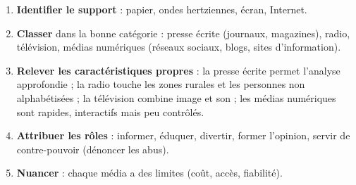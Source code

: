 \documentclass[11pt]{article}
\begin{document}
\begin{methode}
\begin{enumerate}
\item \textbf{Identifier le support} : papier, ondes hertziennes, écran, Internet.
\item \textbf{Classer} dans la bonne catégorie : presse écrite (journaux, magazines), radio, télévision, médias numériques (réseaux sociaux, blogs, sites d'information).
\item \textbf{Relever les caractéristiques propres} : la presse écrite permet l'analyse approfondie ; la radio touche les zones rurales et les personnes non alphabétisées ; la télévision combine image et son ; les médias numériques sont rapides, interactifs mais peu contrôlés.
\item \textbf{Attribuer les rôles} : informer, éduquer, divertir, former l'opinion, servir de contre-pouvoir (dénoncer les abus).
\item \textbf{Nuancer} : chaque média a des limites (coût, accès, fiabilité).
\end{enumerate}
\end{methode}
\end{document}
